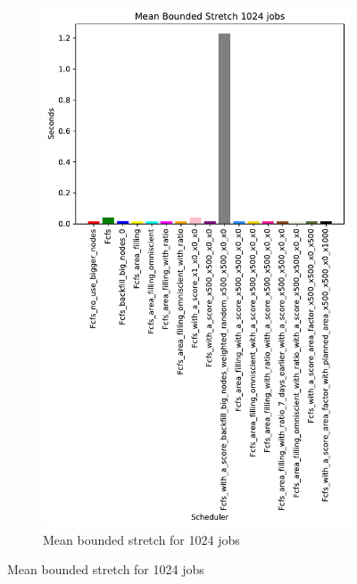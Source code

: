 \documentclass[a4paper]{article}
\begin{document}
\begin{figure}[H]
\begin{subfigure}[b]{0.4\linewidth}\centering\includegraphics[width=0.7\linewidth]{MBSS/plot/Results_Size_And_Data_2022-02-02->2022-02-03_V9532_Mean_Stretch_With_a_Minimum_1024_450_128_32_256_4_1024.pdf}\caption{Mean bounded stretch for 1024 jobs}\label{45}\end{subfigure}

\end{figure}
\end{document}
